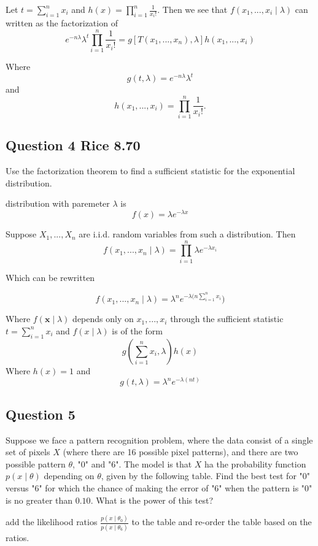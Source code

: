 \documentclass{tufte-book}
\theoremstyle{mytheoremstyle}
\theoremstyle{mylemstyle}
\theoremstyle{mydefstyle}
\begin{document}
\begin{enumerate}
Let $t=\sum_{i=1}^n x_i$ and $h(x)=\prod_{i=1}^n \frac{1}{x_i!}$. Then we see that $f(x_1,...,x_i \mid \lambda)$ can written as the factorization of
\[ e^{-n\lambda} \lambda^t \prod_{i=1}^n \frac{1}{x_i!} = g[T(x_1,...,x_n), \lambda] h(x_1,...,x_i) \]

Where
\[ g(t, \lambda) = e^{-n\lambda} \lambda^t \]
and
\[ h(x_1,...,x_i) = \prod_{i=1}^n \frac{1}{x_i!}. \]

\end{enumerate}

\subsection{Question 4 Rice 8.70}
Use the factorization theorem to find a sufficient statistic for the exponential distribution.

 distribution with paremeter $\lambda$ is
\[ f(x) = \lambda e^{-\lambda x} \]

Suppose $X_1,..., X_n$ are i.i.d. random variables from such a distribution.  Then
\[ f(x_1,...,x_n\mid \lambda) = \prod_{i=1}^n \lambda e^{-\lambda x_i} \]

Which can be rewritten

\[ f(x_1,...,x_n\mid \lambda) = \lambda^n e^{-\lambda (n \sum_{i=1}^n x_i}) \]

Where $f(\mathbf{x}\mid \lambda)$ depends only on $x_1,...,x_i$ through the sufficient statistic $t=\sum_{i=1}^n x_i$ and $f(x \mid \lambda)$ is of the form
\[ g(\sum_{i=1}^n x_i, \lambda) h(x) \]
Where $h(x) = 1$ and
\[ g(t, \lambda) = \lambda^n e^{-\lambda (nt)} \]


\subsection{Question 5}
Suppose we face a pattern recognition problem, where the data consist of a single set of pixels $X$ (where there are 16 possible pixel patterns), and there are two possible pattern $\theta$, "0" and "6".  The model is that $X$ ha the probability function $p(x \mid \theta)$ depending on $\theta$, given by the following table.  Find the best test for "0" versus "6" for which the chance of making the error of "6" when the pattern is "0" is no greater than $0.10$.  What is the power of this test?

 add the likelihood ratios $\frac{p(x\mid \theta_0)}{p(x\mid \theta_6)}$ to the table and re-order the table based on the ratios.
\end{document}
